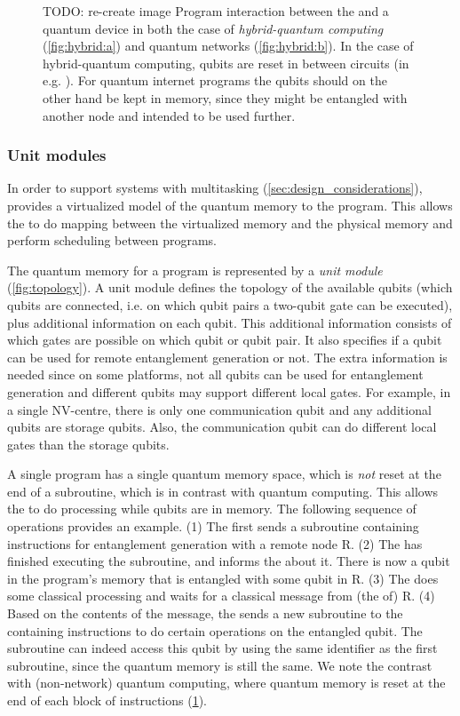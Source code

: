 \begin{figure}
      \centering
      \caption{{\color{red} TODO: re-create image} Program interaction between the \host and a quantum device in
            both the case of \emph{hybrid-quantum computing} (\cref{fig:hybrid:a})
            and quantum networks (\cref{fig:hybrid:b}). In the case of hybrid-quantum
            computing, qubits are reset in between circuits (in e.g. \qasm). For
            quantum internet programs the qubits should on the other hand be
            kept in memory, since they might be entangled with another node and
            intended to be used further.}\label{fig:hybrid}
\end{figure}

\subsubsection{Unit modules}
In order to support systems with multitasking (\cref{sec:design_considerations}), \netqasm provides a virtualized model of the quantum memory to the program.
This allows the \QNPU to do mapping between the virtualized memory and the physical memory and perform scheduling between programs.

The quantum memory for a program is represented by a \textit{unit module} (\cref{fig:topology}).
A unit module defines the topology of the available qubits (which qubits are connected, i.e. on which qubit pairs a two-qubit gate can be executed), plus additional information on each qubit.
This additional information consists of which gates are possible on which qubit or qubit pair.
It also specifies if a qubit can be used for remote entanglement generation or not.
The extra information is needed since on some platforms, not all qubits can be used for entanglement generation and different qubits may support different local gates.
For example, in a single NV-centre, there is only one communication qubit and any additional qubits are storage qubits.
Also, the communication qubit can do different local gates than the storage qubits.

A single program has a single quantum memory space, which is \textit{not} reset at the end of a subroutine, which is in contrast with quantum computing.
This allows the \host to do processing while qubits are in memory.
The following sequence of operations provides an example.
    (1) The \host first sends a subroutine containing instructions for entanglement generation with a remote node R.
    (2) The \QNPU has finished executing the subroutine, and informs the \host about it.
        There is now a qubit in the program's memory that is entangled with some qubit in R.
    (3) The \host does some classical processing and waits for a classical message from (the \host of) R.
    (4) Based on the contents of the message, the \host sends a new subroutine to the \QNPU containing instructions to do certain operations on the entangled qubit.
        The subroutine can indeed access this qubit by using the same identifier as the first subroutine, since the quantum memory is still the same.
        We note the contrast with (non-network) quantum computing, where quantum memory is reset at the end of each block of instructions (\cref{fig:hybrid}).


